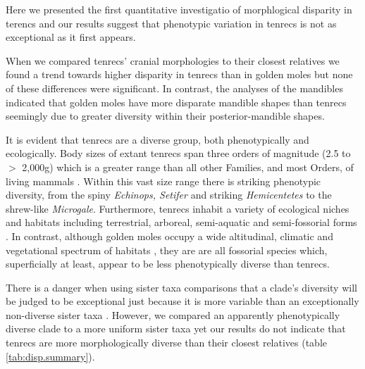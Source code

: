 \documentclass[12pt,a4paper]{article}
\begin{document}
	Here we presented the first quantitative investigatio of morphlogical disparity in terencs and our results suggest that phenotypic variation in tenrecs is not as exceptional as it first appears.
	 
	When we compared tenrecs' cranial morphologies to their closest relatives we found a trend towards higher disparity in tenrecs than in golden moles but none of these differences were significant. In contrast, the analyses of the mandibles indicated that golden moles have more disparate mandible shapes than tenrecs seemingly due to greater diversity within their posterior-mandible shapes.

	
	It is evident that tenrecs are a diverse group, both phenotypically and ecologically. Body sizes of extant tenrecs span three orders of magnitude (2.5 to $>$ 2,000g) which is a greater range than all other Families, and most Orders, of living mammals \citep{Olson2003}. Within this vast size range there is striking phenotypic diversity, from the spiny \textit{Echinops, Setifer} and striking \textit{Hemicentetes} to the shrew-like  \textit{Microgale}. Furthermore, tenrecs inhabit a variety of ecological niches and habitats including terrestrial, arboreal, semi-aquatic and semi-fossorial forms \citep{Soarimalala2011}. 
	In contrast, although golden moles occupy a wide altitudinal, climatic and vegetational spectrum of habitats \citep{Bronner1995}, they are are all fossorial species which, superficially at least, appear to be less phenotypically diverse than tenrecs. 
	
	There is a danger when using sister taxa comparisons that a clade's diversity will be judged to be exceptional just because it is more variable than an exceptionally non-diverse sister taxa \citep{Losos2002}. However, we compared an apparently phenotypically diverse clade to a more uniform sister taxa yet our results do not indicate that tenrecs are more morphologically diverse than their closest relatives (table \ref{tab:disp.summary}). 
	
	
   

	
	
\end{document}

